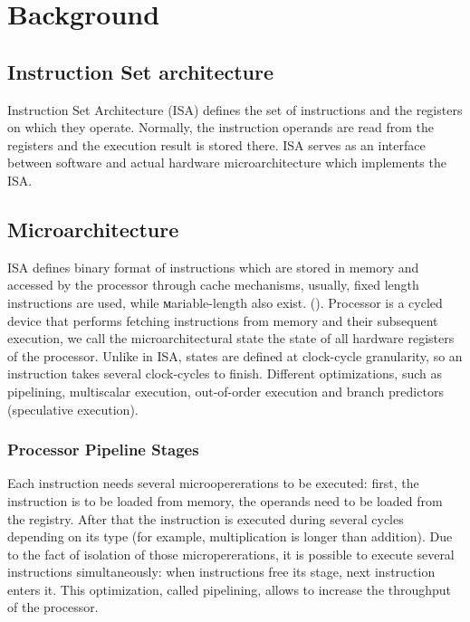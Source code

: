 \chapter{Background}

\section{Instruction Set architecture}

Instruction Set Architecture (ISA) defines the set of instructions and the registers on which they operate. Normally, the instruction operands are read from the registers and the execution result is stored there. ISA serves as an interface between software and actual hardware microarchitecture which implements the ISA. 


\section{Microarchitecture}

ISA defines binary format of instructions which are stored in memory and accessed by the processor through cache mechanisms, usually, fixed length instructions are used, while мariable-length also exist. (). Processor is a cycled device that performs fetching instructions from memory and their subsequent execution, we call the microarchitectural state the state of all hardware registers of the processor. Unlike in ISA, states are defined at clock-cycle granularity, so an instruction takes several clock-cycles to finish. Different optimizations, such as pipelining, multiscalar execution, out-of-order execution and branch predictors (speculative execution).

\subsection{Processor Pipeline Stages}

Each instruction needs several microopererations to be executed: first, the instruction is to be loaded from memory, the operands need to be loaded from the registry. After that the instruction is executed during several cycles depending on its type (for example, multiplication is longer than addition). Due to the fact of isolation of those micropererations, it is possible to execute several instructions simultaneously: when instructions free its stage, next instruction enters it. This optimization, called pipelining, allows to increase the throughput of the processor.

